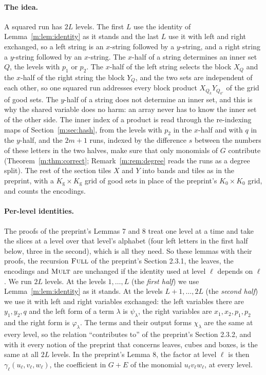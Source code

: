 \documentclass[11pt]{article}
\theoremstyle{definition}
\theoremstyle{remark}
\newcommand{\Mult}{\textnormal{\textsc{Mult}}}
\newcommand{\Full}{\textnormal{\textsc{Full}}}
\newcommand{\Kg}{K_{\mathrm g}}
\begin{document}
\paragraph{The idea.} A squared run has $2L$ levels. The first $L$ use the identity of Lemma~\ref{m:lem:identity} as it stands and the last $L$ use it with left and right exchanged, so a left string is an $x$-string followed by a $y$-string, and a right string a $y$-string followed by an $x$-string. The $x$-half of a string determines an inner set $Q$, the levels with $p_1$ or $p_2$. The $x$-half of the left string selects the block $X_Q$ and the $x$-half of the right string the block $Y_Q$, and the two sets are independent of each other, so one squared run addresses every block product $X_{Q_k}Y_{Q_{k'}}$ of the grid of good sets. The $y$-half of a string does not determine an inner set, and this is why the shared variable does no harm: an array never has to know the inner set of the other side. The inner index of a product is read through the re-indexing maps of Section~\ref{m:sec:hash}, from the levels with $p_2$ in the $x$-half and with $q$ in the $y$-half, and the $2m+1$ runs, indexed by the difference $s$ between the numbers of these letters in the two halves, make sure that only monomials of $G$ contribute (Theorem~\ref{m:thm:correct}; Remark~\ref{m:rem:degree} reads the runs as a degree split). The rest of the section tiles $X$ and $Y$ into bands and tiles as in the preprint, with a $\Kg\times\Kg$ grid of good sets in place of the preprint's $K_0\times K_0$ grid, and counts the encodings.

\paragraph{Per-level identities.} The proofs of the preprint's Lemmas 7 and 8 treat one level at a time and take the slices at a level over that level's alphabet (four left letters in the first half below, three in the second), which is all they need. So these lemmas with their proofs, the recursion $\Full$ of the preprint's Section 2.3.1, the leaves, the encodings and $\Mult$ are unchanged if the identity used at level $\ell$ depends on $\ell$. We run $2L$ levels. At the levels $1,\dots,L$ (the \emph{first half}) we use Lemma~\ref{m:lem:identity} as it stands. At the levels $L+1,\dots,2L$ (the \emph{second half}) we use it with left and right variables exchanged: the left variables there are $y_1,y_2,q$ and the left form of a term $\lambda$ is $\psi_\lambda$, the right variables are $x_1,x_2,p_1,p_2$ and the right form is $\varphi_\lambda$. The terms and their output forms $\chi_\lambda$ are the same at every level, so the relation ``contributes to'' of the preprint's Section 2.3.2, and with it every notion of the preprint that concerns leaves, cubes and boxes, is the same at all $2L$ levels. In the preprint's Lemma 8, the factor at level $\ell$ is then $\gamma_\ell(u_\ell,v_\ell,w_\ell)$, the coefficient in $G+E$ of the monomial $u_\ell v_\ell w_\ell$, at every level.
\end{document}
